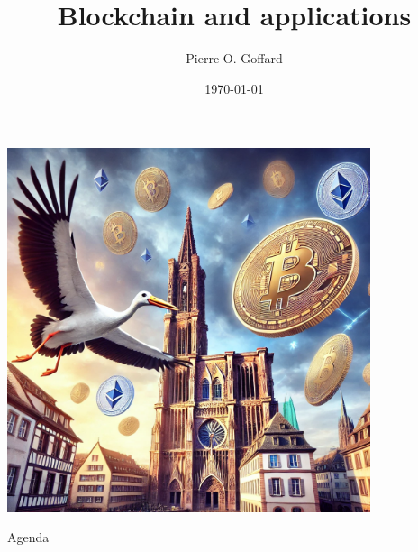 \documentclass{beamer}
\title[ITI IRMIA++]{Blockchain and applications}
\author{Pierre-O. Goffard}
\institute[UNISTRA]{Université de Strasbourg\\
 \texttt{goffard@unistra.fr}
}
\date{\today}
\begin{document}
\begin{frame}[plain]
\centering
  \includegraphics[width=0.8\textwidth]{../../Figures/bitcoin-eth-strasbourg.png}
\end{frame}
\begin{frame}
  \titlepage
\end{frame}
\begin{frame}{Agenda}
  \tableofcontents
\end{frame}
\end{document}
